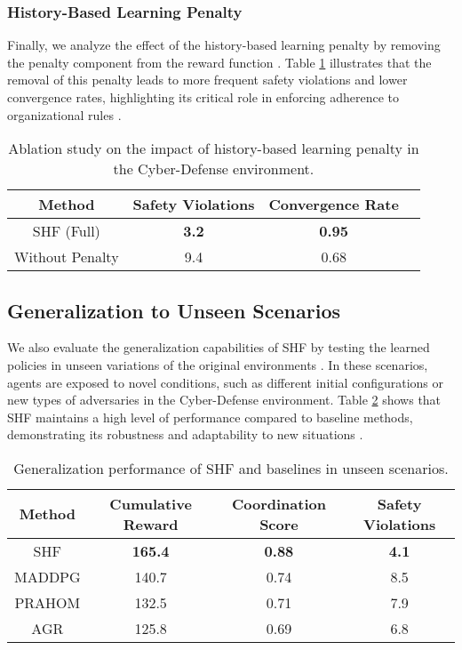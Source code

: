 \documentclass[sigconf,anonymous]{aamas}
\begin{document}

\subsubsection{History-Based Learning Penalty}
Finally, we analyze the effect of the history-based learning penalty by removing the penalty component from the reward function \cite{foerster2018counterfactual}. Table \ref{table:history_penalty_ablation} illustrates that the removal of this penalty leads to more frequent safety violations and lower convergence rates, highlighting its critical role in enforcing adherence to organizational rules \cite{hubner2010moise}.

\begin{table}[ht]
\centering
\caption{Ablation study on the impact of history-based learning penalty in the Cyber-Defense environment.}
\label{table:history_penalty_ablation}
\begin{tabular}{|c|c|c|c|}
\hline
\textbf{Method} & \textbf{Safety Violations} & \textbf{Convergence Rate} \\ \hline
SHF (Full) & \textbf{3.2} & \textbf{0.95} \\ \hline
Without Penalty & 9.4 & 0.68 \\ \hline
\end{tabular}
\end{table}


\subsection{Generalization to Unseen Scenarios}
We also evaluate the generalization capabilities of SHF by testing the learned policies in unseen variations of the original environments \cite{wei2019safe}. In these scenarios, agents are exposed to novel conditions, such as different initial configurations or new types of adversaries in the Cyber-Defense environment. Table \ref{table:generalization} shows that SHF maintains a high level of performance compared to baseline methods, demonstrating its robustness and adaptability to new situations \cite{foerster2018counterfactual}.

\begin{table}[ht]
\centering
\caption{Generalization performance of SHF and baselines in unseen scenarios.}
\label{table:generalization}
\begin{tabular}{|c|c|c|c|}
\hline
\textbf{Method} & \textbf{Cumulative Reward} & \textbf{Coordination Score} & \textbf{Safety Violations} \\ \hline
SHF & \textbf{165.4} & \textbf{0.88} & \textbf{4.1} \\ \hline
MADDPG & 140.7 & 0.74 & 8.5 \\ \hline
PRAHOM & 132.5 & 0.71 & 7.9 \\ \hline
AGR & 125.8 & 0.69 & 6.8 \\ \hline
\end{tabular}
\end{table}
\end{document}
